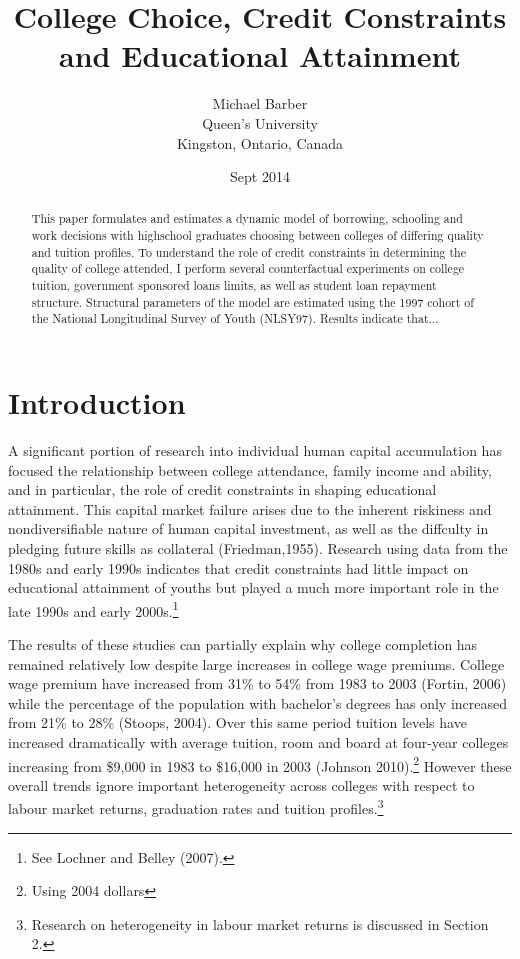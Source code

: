 \documentclass[letterpaper,12pt]{article}
\title{College Choice, Credit Constraints and Educational Attainment}
\author{   Michael Barber \vspace{0.75in} \\
    Queen's University \\
    Kingston, Ontario, Canada}
\date{Sept 2014 \vspace{1in} \\
}
\newlength{\defbaselineskip}
\newcommand{\doublespacing}{\setlength{\baselineskip}{1.6 \defbaselineskip}}
\begin{document}
\doublespacing
\maketitle {}

\begin{abstract}

This paper formulates and estimates a dynamic model of borrowing, schooling and work decisions with highschool graduates choosing between colleges of differing quality and tuition profiles. To understand the role of credit constraints in determining the quality of college attended, I perform several counterfactual experiments on college tuition, government sponsored loans limits, as well as student loan repayment structure. Structural parameters of the model are estimated using the 1997 cohort of the National Longitudinal Survey of Youth (NLSY97). Results indicate that...


\end{abstract}
\newpage

\newpage
{}
\section{Introduction}

A significant portion of research into individual human capital accumulation has focused the relationship between college attendance, family income and ability, and in particular, the role of credit constraints in shaping educational attainment. This capital market failure arises due to the inherent riskiness and nondiversifiable nature of human capital investment, as well as the diffculty in pledging future skills as collateral (Friedman,1955). Research using data from the 1980s and early 1990s indicates that credit constraints had little impact on educational attainment of youths but played a much more important role in the late 1990s and early 2000s.\footnote{See Lochner and Belley (2007).} 

The results of these studies can partially explain why college completion has remained relatively low despite large increases in college wage premiums. College wage premium have increased from 31\% to 54\% from 1983 to 2003 (Fortin, 2006) while the percentage of the population with bachelor's degrees has only increased from 21\% to 28\% (Stoops, 2004). Over this same period tuition levels have increased dramatically with average tuition, room and board at four-year colleges increasing from \$9,000 in 1983 to \$16,000 in 2003 (Johnson 2010).\footnote{Using 2004 dollars} However these overall trends ignore important heterogeneity across colleges with respect to labour market returns, graduation rates and tuition profiles.\footnote{Research on heterogeneity in labour market returns is discussed in Section 2.}
\end{document}
